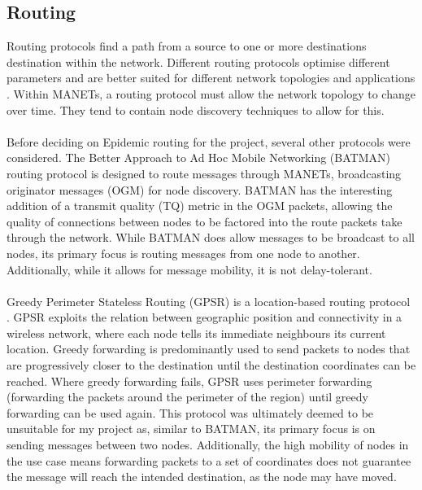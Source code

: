 \documentclass[12pt,a4paper]{report}
\begin{document}
\subsection{Routing}
Routing protocols find a path from a source to one or more destinations destination within the network. Different routing protocols optimise different parameters and are better suited for different network topologies and applications \cite{princom}. Within MANETs, a routing protocol must allow the network topology to change over time. They tend to contain node discovery techniques to allow for this. \\ \\
Before deciding on Epidemic routing for the project, several other protocols were considered. The Better Approach to Ad Hoc Mobile Networking (BATMAN) routing protocol \cite{batman} is designed to route messages through MANETs, broadcasting originator messages (OGM) for node discovery. BATMAN has the interesting addition of a transmit quality (TQ) metric in the OGM packets, allowing the quality of connections between nodes to be factored into the route packets take through the network. While BATMAN does allow messages to be broadcast to all nodes, its primary focus is routing messages from one node to another. Additionally, while it allows for message mobility, it is not delay-tolerant.\\ \\
Greedy Perimeter Stateless Routing (GPSR) is a location-based routing protocol \cite{gpsr}. GPSR exploits the relation between geographic position and connectivity in a wireless network, where each node tells its immediate neighbours its current location. Greedy forwarding is predominantly used to send packets to nodes that are progressively closer to the destination until the destination coordinates can be reached. Where greedy forwarding fails, GPSR uses perimeter forwarding (forwarding the packets around the perimeter of the region) until greedy forwarding can be used again. This protocol was ultimately deemed to be unsuitable for my project as, similar to BATMAN, its primary focus is on sending messages between two nodes. Additionally, the high mobility of nodes in the use case means forwarding packets to a set of coordinates does not guarantee the message will reach the intended destination, as the node may have moved.
\end{document}
